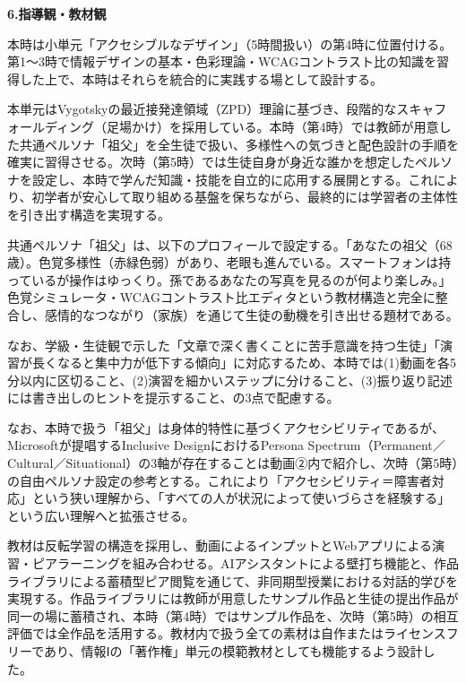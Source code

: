 \documentclass[uplatex,a4paper,11pt]{jsarticle}
\newcommand{\itemhead}[2]{\par\medskip\noindent\textbf{#1.\quad #2}\par\nopagebreak\smallskip}
\begin{document}
\itemhead{6}{指導観・教材観}
\hspace{1zw}本時は小単元「アクセシブルなデザイン」（5時間扱い）の第4時に位置付ける。第1〜3時で情報デザインの基本・色彩理論・WCAGコントラスト比の知識を習得した上で、本時はそれらを統合的に実践する場として設計する。\par
\hspace{1zw}本単元はVygotskyの最近接発達領域（ZPD）理論に基づき、段階的なスキャフォールディング（足場かけ）を採用している。本時（第4時）では教師が用意した共通ペルソナ「祖父」を全生徒で扱い、多様性への気づきと配色設計の手順を確実に習得させる。次時（第5時）では生徒自身が身近な誰かを想定したペルソナを設定し、本時で学んだ知識・技能を自立的に応用する展開とする。これにより、初学者が安心して取り組める基盤を保ちながら、最終的には学習者の主体性を引き出す構造を実現する。\par
\hspace{1zw}共通ペルソナ「祖父」は、以下のプロフィールで設定する。「あなたの祖父（68歳）。色覚多様性（赤緑色弱）があり、老眼も進んでいる。スマートフォンは持っているが操作はゆっくり。孫であるあなたの写真を見るのが何より楽しみ。」色覚シミュレータ・WCAGコントラスト比エディタという教材構造と完全に整合し、感情的なつながり（家族）を通じて生徒の動機を引き出せる題材である。\par
\hspace{1zw}なお、学級・生徒観で示した「文章で深く書くことに苦手意識を持つ生徒」「演習が長くなると集中力が低下する傾向」に対応するため、本時では(1)動画を各5分以内に区切ること、(2)演習を細かいステップに分けること、(3)振り返り記述には書き出しのヒントを提示すること、の3点で配慮する。\par
\hspace{1zw}なお、本時で扱う「祖父」は身体的特性に基づくアクセシビリティであるが、Microsoftが提唱するInclusive DesignにおけるPersona Spectrum（Permanent／Cultural／Situational）の3軸が存在することは動画②内で紹介し、次時（第5時）の自由ペルソナ設定の参考とする。これにより「アクセシビリティ＝障害者対応」という狭い理解から、「すべての人が状況によって使いづらさを経験する」という広い理解へと拡張させる。\par
\hspace{1zw}教材は反転学習の構造を採用し、動画によるインプットとWebアプリによる演習・ピアラーニングを組み合わせる。AIアシスタントによる壁打ち機能と、作品ライブラリによる蓄積型ピア閲覧を通じて、非同期型授業における対話的学びを実現する。作品ライブラリには教師が用意したサンプル作品と生徒の提出作品が同一の場に蓄積され、本時（第4時）ではサンプル作品を、次時（第5時）の相互評価では全作品を活用する。教材内で扱う全ての素材は自作またはライセンスフリーであり、情報Ⅰの「著作権」単元の模範教材としても機能するよう設計した。\par
\end{document}
